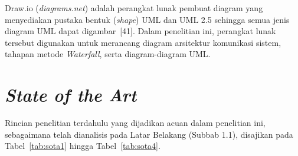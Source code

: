 \documentclass[12pt,a4paper,twoside]{report}
\begin{document}
Draw.io (\textit{diagrams.net}) adalah perangkat lunak pembuat diagram yang menyediakan pustaka bentuk (\textit{shape}) UML dan UML 2.5 sehingga semua jenis diagram UML dapat digambar~[41]. Dalam penelitian ini, perangkat lunak tersebut digunakan untuk merancang diagram arsitektur komunikasi sistem, tahapan metode \textit{Waterfall}, serta diagram-diagram UML.

\section{\textit{State of the Art}}

Rincian penelitian terdahulu yang dijadikan acuan dalam penelitian ini, sebagaimana telah dianalisis pada Latar Belakang (Subbab 1.1), disajikan pada Tabel~\ref{tab:sota1} hingga Tabel~\ref{tab:sota4}.
\end{document}

